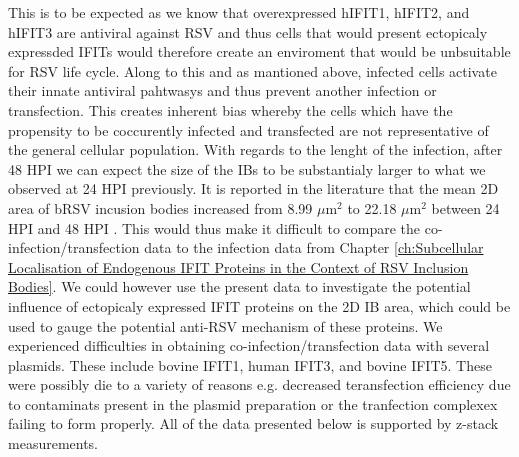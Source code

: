 This is to be expected as we know that overexpressed hIFIT1, hIFIT2, and hIFIT3 are antiviral against RSV and thus cells that would present ectopicaly expressded IFITs would therefore create an enviroment that would be unbsuitable for RSV life cycle. Along to this and as mantioned above, infected cells activate their innate antiviral pahtwasys and thus prevent another infection or transfection. This creates inherent bias whereby the cells which have the propensity to be coccurently infected and transfected are not representative of the general cellular population. With regards to the lenght of the infection, after 48 HPI we can expect the size of the IBs to be substantialy larger to what we observed at 24 HPI previously. It is reported in the literature that the mean 2D area of bRSV incusion bodies increased from 8.99 \(\mu \mbox{m}^2\) to 22.18 \(\mu \mbox{m}^2\) between 24 HPI and 48 HPI \cite{Jobe2021BovineResponses}. This would thus make it difficult to compare the co-infection/transfection data to the infection data from Chapter \ref{ch:Subcellular Localisation of Endogenous IFIT Proteins in the Context of RSV Inclusion Bodies}. We could however use the present data to investigate the potential influence of ectopicaly expressed IFIT proteins on the 2D IB area, which could be used to gauge the potential anti-RSV mechanism of these proteins. We experienced difficulties in obtaining co-infection/transfection data with several plasmids. These include bovine IFIT1, human IFIT3, and bovine IFIT5. These were possibly die to a variety of reasons e.g. decreased teransfection efficiency due to contaminats present in the plasmid preparation or the tranfection complexex failing to form properly. All of the data presented below is supported by z-stack measurements.

